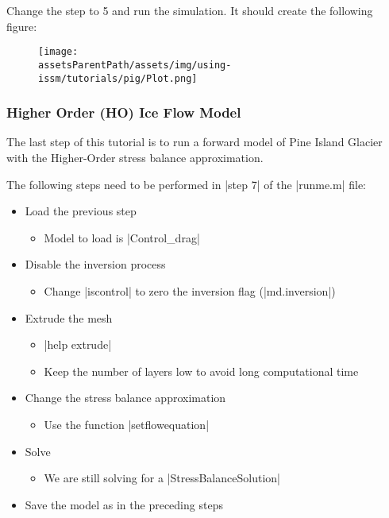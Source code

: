Change the step to 5 and run the simulation. It should create the following figure:
\begin{figure}[H]
	\begin{center}
		\texttt{[image: \\assetsParentPath/assets/img/using-issm/tutorials/pig/Plot.png]}
	\end{center}
\end{figure}
\subsubsection{Higher Order (HO) Ice Flow Model}%
The last step of this tutorial is to run a forward model of Pine Island Glacier with the Higher-Order stress balance approximation.

The following steps need to be performed in \lstinlinebg|step 7| of the \lstinlinebg|runme.m| file:
\begin{itemize}
	\item Load the previous step
		\begin{itemize}
			\item Model to load is \lstinlinebg|Control_drag|
		\end{itemize}
	\item Disable the inversion process
		\begin{itemize}
			\item Change \lstinlinebg|iscontrol| to zero the inversion flag (\lstinlinebg|md.inversion|)
		\end{itemize}
	\item Extrude the mesh
		\begin{itemize}
			\item \lstinlinebg|help extrude|
			\item Keep the number of layers low to avoid long computational time
		\end{itemize}
	\item Change the stress balance approximation
		\begin{itemize}
			\item Use the function \lstinlinebg|setflowequation|
		\end{itemize}
	\item Solve
		\begin{itemize}
			\item We are still solving for a \lstinlinebg|StressBalanceSolution|
		\end{itemize}
	\item Save the model as in the preceding steps
\end{itemize}

